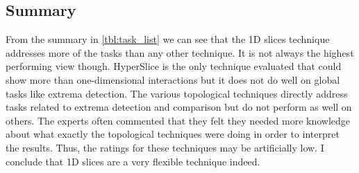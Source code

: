 \subsection{Summary}

From the summary in \autoref{tbl:task_list} we can see that the 1D slices
technique addresses more of the tasks than any other technique.  It is not
always the highest performing view though.  HyperSlice is the only technique 
evaluated that could show more than one-dimensional interactions but it does
not do well on global tasks like extrema detection. The various topological
techniques directly address tasks related to extrema detection and comparison
but do not perform as well on others. 
The experts often commented that they felt they needed more knowledge about
what exactly the topological techniques were doing in order to interpret
the results. Thus, the ratings for these techniques may be artificially low.
I conclude that 1D slices are a
very flexible technique indeed.  

